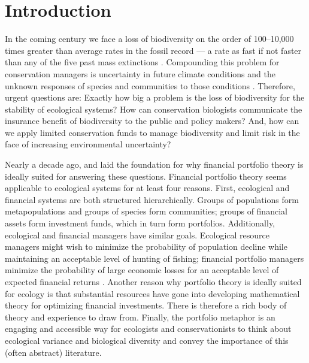 \section{Introduction}\label{introduction}

In the coming century we face a loss of biodiversity on the order of 100--10,000 times greater than average rates in the fossil record \citep{mea2005} --- a rate as fast if not faster than any of the five past mass extinctions \citep{barnosky2011, harnik2012}. Compounding this problem for conservation managers is uncertainty in future climate conditions \citep{heller2009} and the unknown responses of species and communities to those conditions \citep{lavergne2010}. Therefore, urgent questions are: Exactly how big a problem is the loss of biodiversity for the stability of ecological systems? How can conservation biologists communicate the insurance benefit of biodiversity to the public and policy makers? And, how can we apply limited conservation funds to manage biodiversity and limit risk in the face of increasing environmental uncertainty?

Nearly a decade ago, \citet{figge2004} and \citet{koellner2006} laid the foundation for why financial portfolio theory is ideally suited for answering these questions. Financial portfolio theory seems applicable to ecological systems for at least four reasons. First, ecological and financial systems are both structured hierarchically. Groups of populations form metapopulations and groups of species form communities; groups of financial assets form investment funds, which in turn form portfolios. Additionally, ecological and financial managers have similar goals. Ecological resource managers might wish to minimize the probability of population decline while maintaining an acceptable level of hunting of fishing; financial portfolio managers minimize the probability of large economic losses for an acceptable level of expected financial returns \citep{may2008}. Another reason why portfolio theory is ideally suited for ecology is that substantial resources have gone into developing mathematical theory for optimizing financial investments. There is therefore a rich body of theory and experience to draw from. Finally, the portfolio metaphor is an engaging and accessible way for ecologists and conservationists to think about ecological variance and biological diversity and convey the importance of this (often abstract) literature.

